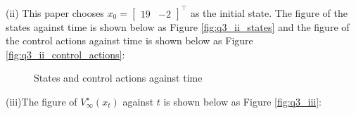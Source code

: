 \documentclass[a4paper,11pt,reqno]{amsart}
\newcommand{\tran}{\intercal}
\begin{document}
(ii)
This paper chooses $x_0 = \begin{bmatrix} 19 & -2 \end{bmatrix}^{\tran}$ as the initial state. The figure of the states against time is shown below as Figure \ref{fig:q3_ii_states}
and the figure of the control actions against time is shown below as Figure \ref{fig:q3_ii_control_actions}:
\begin{figure}[H]
    \centering
    \vspace{-0.35cm}
    \subfigtopskip=2pt
    \subfigbottomskip=2pt
    \subfigcapskip=-5pt
    \quad
    \caption{States and control actions against time}
    \label{fig:q3_ii}
\end{figure}
(iii)The figure of $V^{\star}_{\infty}(x_t) $ against $t$ is shown below as Figure \ref{fig:q3_iii}:
\end{document}
